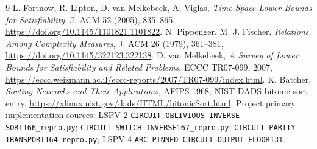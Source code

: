 \documentclass[11pt]{article}
\begin{document}
\begin{thebibliography}{9}
 L. Fortnow, R. Lipton, D. van Melkebeek, A. Viglas, \emph{Time-Space Lower Bounds for Satisfiability}, J. ACM 52 (2005), 835--865, \url{https://doi.org/10.1145/1101821.1101822}.
 N. Pippenger, M. J. Fischer, \emph{Relations Among Complexity Measures}, J. ACM 26 (1979), 361--381, \url{https://doi.org/10.1145/322123.322138}.
 D. van Melkebeek, \emph{A Survey of Lower Bounds for Satisfiability and Related Problems}, ECCC TR07-099, 2007, \url{https://eccc.weizmann.ac.il/eccc-reports/2007/TR07-099/index.html}.
 K. Batcher, \emph{Sorting Networks and Their Applications}, AFIPS 1968; NIST DADS bitonic-sort entry, \url{https://xlinux.nist.gov/dads/HTML/bitonicSort.html}.
 Project primary implementation sources: LSPV-2 \texttt{CIRCUIT-OBLIVIOUS-INVERSE-SORT166\_repro.py}; \texttt{CIRCUIT-SWITCH-INVERSE167\_repro.py}; \texttt{CIRCUIT-PARITY-TRANSPORT164\_repro.py}; LSPV-4 \texttt{ARC-PINNED-CIRCUIT-OUTPUT-FLOOR131}.
\end{thebibliography}
\end{document}
